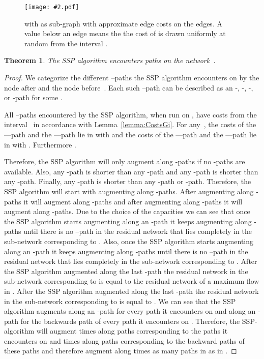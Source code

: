 \documentclass[11pt]{article}
\newtheorem{theorem}{Theorem}
\newcommand{\GFX}[2][]{\texttt{[image: \#2.pdf]}}
\newenvironment{fig}
{\begin{figure}[th]\begin{center}}
{\end{center}\end{figure}}
\begin{document}
\begin{fig}
  \GFX[width=0.95\textwidth]{Iteration2}
  \caption{ with  as sub-graph with approximate edge costs on the edges. A value  below an edge  means the the cost of  is drawn uniformly at random from the interval .}
  \label{fig:step III}
\end{fig}

\begin{theorem}
The SSP algorithm encounters  paths on the network~.
\end{theorem}

\begin{proof}
We categorize the different --paths the SSP algorithm encounters on  by the node after  and the node before~.
Each such --path can be described as an -, -, -, or -path for some .

All --paths encountered by the SSP algorithm, when run on , have costs from the interval~ in accordance with Lemma~\ref{lemma:CostsGi}.
For any~, the costs of the ---path and the ---path lie
in  with  and the costs of the ---path and the
---path lie in  with .
Furthermore .

Therefore, the SSP algorithm will
only augment along -paths if no -paths are available.
Also, any -path is shorter than any -path and any -path is shorter than any
-path. Finally, any -path is shorter than any -path or -path.
Therefore, the SSP algorithm will start with augmenting along -paths. After augmenting along -paths it will augment
along -paths and after augmenting along -paths it will augment along -paths.
Due to the choice of the capacities we can see that once the SSP algorithm starts augmenting along an -path it keeps augmenting
along -paths until there is no --path in the residual network that lies completely in the sub-network corresponding
to . Also, once the SSP algorithm starts augmenting along an -path it keeps augmenting along -paths until
there is no --path in the residual network that lies completely in the sub-network corresponding  to .
After the SSP algorithm augmented along the last -path the residual network in the sub-network corresponding to  is equal
to the residual network of a maximum flow in . After the SSP algorithm augmented along the last -path the residual network
in the sub-network corresponding to  is equal to . We can see that the SSP algorithm augments along an -path for every path  it encounters on  and along an
-path for the backwards path  of every path  it encounters on .
Therefore, the SSP-algorithm will augment  times along paths corresponding to the paths it encounters on  and  times along
paths corresponding to the backward paths of these paths and therefore augment along  times as many paths in
 as in .
\end{proof}
\end{document}
